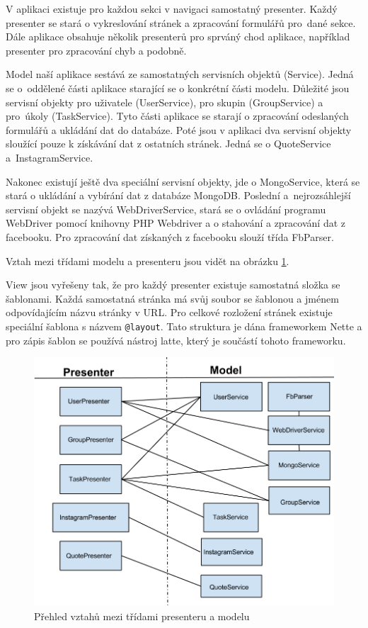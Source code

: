 \documentclass[thesis=M,czech]{FITthesis}[2013/05/10]
\begin{document}
V aplikaci existuje pro každou sekci v navigaci samostatný presenter. Každý presenter se stará o vykreslování stránek  a zpracování formulářů pro~dané sekce. Dále aplikace obsahuje několik presenterů pro sprváný chod aplikace, například presenter pro zpracování chyb a podobně.

Model naší aplikace sestává ze samostatných servisních objektů (Service). Jedná se o~oddělené části aplikace starající se o konkrétní části modelu. Důležité jsou servisní objekty pro uživatele (UserService), pro skupin (GroupService) a pro~úkoly (TaskService). Tyto části aplikace se starají o zpracování odeslaných formulářů a ukládání dat do databáze. Poté jsou v aplikaci dva servisní objekty sloužící pouze k získávání dat z ostatních stránek. Jedná se o QuoteService a~InstagramService. 

Nakonec existují ještě dva speciální servisní objekty, jde o MongoService, která se stará o ukládání a vybírání dat z databáze MongoDB. Poslední a~nejrozsáhlejší servisní objekt se nazývá WebDriverService, stará se o ovládání programu WebDriver pomocí knihovny PHP Webdriver a o stahování a zpracování dat z facebooku. Pro zpracování dat získaných z facebooku slouží třída FbParser.

Vztah mezi třídami modelu a presenteru jsou vidět na obrázku \ref{fig:fcModelPresenter}.

View jsou vyřešeny tak, že pro každý presenter existuje samostatná složka se šablonami. Každá samostatná stránka má svůj soubor se šablonou a jménem odpovídajícím názvu stránky v URL. Pro celkové rozložení stránek existuje speciální šablona s názvem \verb|@layout|. Tato struktura je dána frameworkem Nette a pro zápis šablon se používá nástroj latte, který je součástí tohoto frameworku. 

\begin{figure}[h]
\begin{center}
\includegraphics[width=5in]{figures/fcModelPresenter.png}
\caption{Přehled vztahů mezi třídami presenteru a modelu}
\label{fig:fcModelPresenter}
\end{center}
\end{figure}
\end{document}

